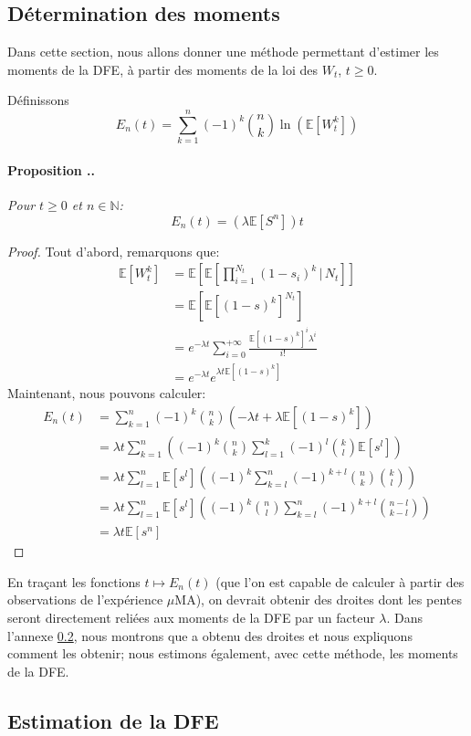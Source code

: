 \documentclass[12pt]{article}
\newcounter{prop}[section]
\newcommand{\prop}[1]{\stepcounter{prop}\paragraph{Proposition \arabic{section}.\arabic{prop}.}\textit{\newline #1}\vspace{0.1cm}}
\newcommand{\pth}[1]{\left(#1\right)}
\newcommand{\cro}[1]{\left[#1\right]}
\newcommand{\En}{\mathbb{N}}
\newcommand{\Esp}[1]{\mathbb{E}\cro{#1}}
\newcommand{\kt }{\,|\,}
\begin{document}
\subsection{Détermination des moments}

Dans cette section, nous allons donner une méthode permettant d'estimer les moments de la DFE, à partir des moments de la loi des $W_t$, $t\geqslant 0$.

Définissons \[E_n(t)=\sum_{k=1}^n(-1)^k\binom{n}{k}\ln\pth{\Esp{W_t^k}}\]

\prop{Pour $t\geqslant 0$ et $n\in\En$: \[E_n(t)=\pth{\lambda\Esp{S^n}}t\]}


\begin{proof}
  Tout d'abord, remarquons que:
  \begin{align*}
    \Esp{W_t^k}&=\Esp{\Esp{\prod_{i=1}^{N_t}(1-s_i)^k\kt N_t}}\\
    &=\Esp{\Esp{(1-s)^k}^{N_t}}\\
    &=e^{-\lambda t}\sum_{i=0}^{+\infty}\frac{\Esp{(1-s)^k}^i\lambda^i}{i!}\\
    &=e^{-\lambda t}e^{\lambda t\Esp{(1-s)^k}}
  \end{align*}
  Maintenant, nous pouvons calculer:
  \begin{align*}
    E_n(t)&=\sum_{k=1}^n(-1)^k\binom{n}{k}\pth{-\lambda t+\lambda\Esp{(1-s)^k}}\\
    &=\lambda t\sum_{k=1}^n\pth{(-1)^k\binom{n}{k}\sum_{l=1}^k(-1)^l\binom{k}{l}\Esp{s^l}}\\
    &=\lambda t\sum_{l=1}^n\Esp{s^l}\pth{(-1)^k\sum_{k=l}^n(-1)^{k+l}\binom{n}{k}\binom{k}{l}}\\
    &=\lambda t\sum_{l=1}^n\Esp{s^l}\pth{(-1)^k\binom{n}{l}\sum_{k=l}^n(-1)^{k+l}\binom{n-l}{k-l}}\\
    &=\lambda t\Esp{s^n}
  \end{align*}
\end{proof}

En traçant les fonctions $t\mapsto E_n(t)$ (que l'on est capable de calculer à partir des observations de l'expérience $\mu$MA), on devrait obtenir des droites dont les pentes seront directement reliées aux moments de la DFE par un facteur $\lambda$. Dans l'annexe \ref{}, nous montrons que \cite{rob} a obtenu des droites et nous expliquons comment les obtenir; nous estimons également, avec cette méthode, les moments de la DFE.


\subsection{Estimation de la DFE}
\end{document}
